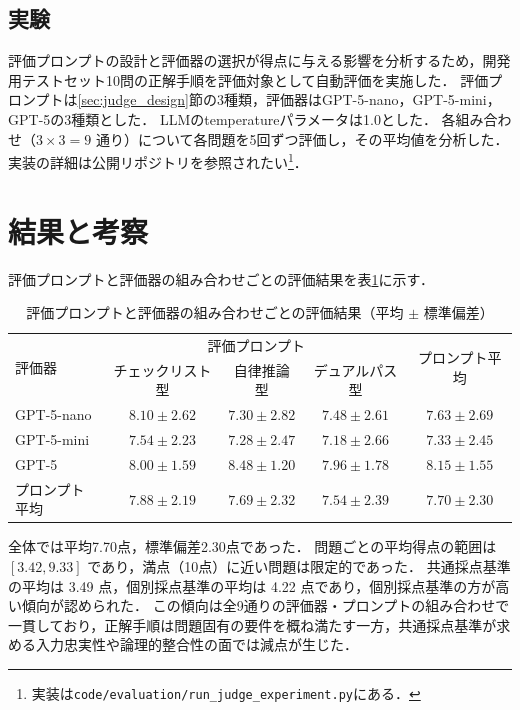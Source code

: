 \documentclass[twocolumn]{jarticle}
\begin{document}
\subsection{実験}
評価プロンプトの設計と評価器の選択が得点に与える影響を分析するため，開発用テストセット10問の正解手順を評価対象として自動評価を実施した．
評価プロンプトは\ref{sec:judge_design}節の3種類，評価器はGPT-5-nano，GPT-5-mini，GPT-5の3種類とした．
LLMのtemperatureパラメータは1.0とした．
各組み合わせ（$3 \times 3 = 9$ 通り）について各問題を5回ずつ評価し，その平均値を分析した．
実装の詳細は公開リポジトリを参照されたい\footnote{実装は\texttt{code/evaluation/run\_judge\_experiment.py}にある．}．


\section{結果と考察}
評価プロンプトと評価器の組み合わせごとの評価結果を表\ref{tab:results_matrix}に示す．
\begin{table}[t]
    \centering
    \caption{評価プロンプトと評価器の組み合わせごとの評価結果（平均 $\pm$ 標準偏差）}
    \label{tab:results_matrix}
    \begin{tabular}{lcccc}
        \toprule
        \multirow{2}{*}{評価器} & \multicolumn{3}{c}{評価プロンプト} & \multirow{2}{*}{プロンプト平均}\\
        & チェックリスト型 & 自律推論型 & デュアルパス型 & \\
        \midrule
        GPT-5-nano & $8.10 \pm 2.62$ & $7.30 \pm 2.82$ & $7.48 \pm 2.61$ & $7.63 \pm 2.69$ \\
        GPT-5-mini & $7.54 \pm 2.23$ & $7.28 \pm 2.47$ & $7.18 \pm 2.66$ & $7.33 \pm 2.45$ \\
        GPT-5      & $8.00 \pm 1.59$ & $8.48 \pm 1.20$ & $7.96 \pm 1.78$ & $8.15 \pm 1.55$ \\
        \midrule
        プロンプト平均 & $7.88 \pm 2.19$ & $7.69 \pm 2.32$ & $7.54 \pm 2.39$ & $7.70 \pm 2.30$ \\
        \bottomrule
    \end{tabular}
\end{table}
全体では平均7.70点，標準偏差2.30点であった．
問題ごとの平均得点の範囲は $[3.42, 9.33]$ であり，満点（10点）に近い問題は限定的であった．
共通採点基準の平均は 3.49 点，個別採点基準の平均は 4.22 点であり，個別採点基準の方が高い傾向が認められた．
この傾向は全9通りの評価器・プロンプトの組み合わせで一貫しており，正解手順は問題固有の要件を概ね満たす一方，共通採点基準が求める入力忠実性や論理的整合性の面では減点が生じた．
\end{document}
